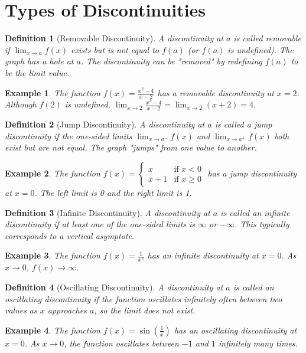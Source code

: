 \documentclass[11pt,a4paper]{article}
\newtheorem{example}{Example}
\newtheorem{definition}{Definition}
\begin{document}
\section{Types of Discontinuities}
\begin{definition}[Removable Discontinuity]
A discontinuity at $a$ is called \textit{removable} if $\displaystyle \lim_{x \to a} f(x)$ exists but is not equal to $f(a)$ (or $f(a)$ is undefined). The graph has a hole at $a$. The discontinuity can be "removed" by redefining $f(a)$ to be the limit value.
\end{definition}
\begin{example}
The function $f(x) = \frac{x^2 - 4}{x - 2}$ has a removable discontinuity at $x = 2$. Although $f(2)$ is undefined, $\lim_{x \to 2} \frac{x^2 - 4}{x - 2} = \lim_{x \to 2} (x + 2) = 4$.
\end{example}
\begin{definition}[Jump Discontinuity]
A discontinuity at $a$ is called a \textit{jump discontinuity} if the one-sided limits $\displaystyle \lim_{x \to a^-} f(x)$ and $\displaystyle \lim_{x \to a^+} f(x)$ both exist but are not equal. The graph "jumps" from one value to another.
\end{definition}
\begin{example}
The function $f(x) = \begin{cases} x & \text{if } x < 0 \\ x + 1 & \text{if } x \geq 0 \end{cases}$ has a jump discontinuity at $x = 0$. The left limit is 0 and the right limit is 1.
\end{example}
\begin{definition}[Infinite Discontinuity]
A discontinuity at $a$ is called an \textit{infinite discontinuity} if at least one of the one-sided limits is $\infty$ or $-\infty$. This typically corresponds to a vertical asymptote.
\end{definition}
\begin{example}
The function $f(x) = \frac{1}{x^2}$ has an infinite discontinuity at $x = 0$. As $x \to 0$, $f(x) \to \infty$.
\end{example}
\begin{definition}[Oscillating Discontinuity]
A discontinuity at $a$ is called an \textit{oscillating discontinuity} if the function oscillates infinitely often between two values as $x$ approaches $a$, so the limit does not exist.
\end{definition}
\begin{example}
The function $f(x) = \sin\left(\frac{1}{x}\right)$ has an oscillating discontinuity at $x = 0$. As $x \to 0$, the function oscillates between $-1$ and $1$ infinitely many times.
\end{example}
\end{document}
